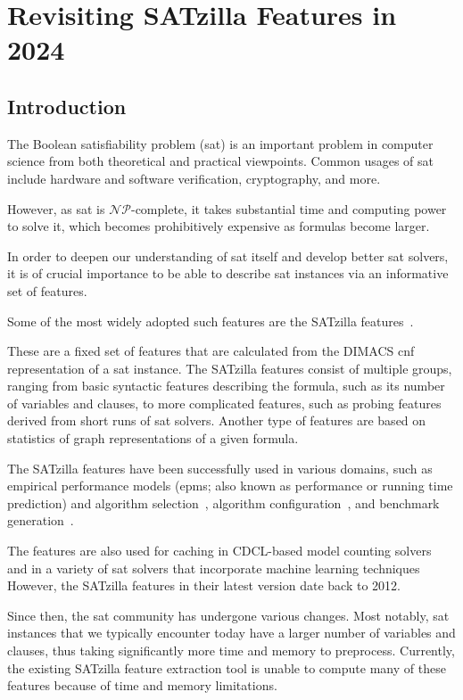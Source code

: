 \chapter{Revisiting SATzilla Features in 2024}\label{ch:ch03:rev_SATzilla}

\section{Introduction}


The Boolean satisfiability problem (\gls{sat}) is an important problem in computer science from both theoretical and practical viewpoints.
Common usages of \gls{sat} include hardware and software verification, cryptography, and more. 

However, as \gls{sat} is $\mathcal{NP}$-complete, it takes substantial time and computing power to solve it, which becomes prohibitively expensive as formulas become larger.

In order to deepen our understanding of \gls{sat} itself and develop better \gls{sat} solvers, it is of crucial importance to be able to describe \gls{sat} instances via an informative set of features.


Some of the most widely adopted such features are the SATzilla features~\cite{NudEtAl04,HutEtAl14}. 

These are a fixed set of features that are calculated from the DIMACS \gls{cnf} representation of a \gls{sat} instance. The SATzilla features consist of multiple groups, ranging from basic syntactic features describing the formula, such as its number of variables and clauses, to more complicated features, such as probing features derived from short runs of \gls{sat} solvers. Another type of features are based on statistics of graph representations of a given formula.

The SATzilla features have been successfully used in various domains, such as empirical performance models (\glspl{epm}; also known as performance or running time prediction) and algorithm selection~\cite{XuEtAl08,XuEtAl12}, algorithm configuration~\cite{HutEtAl11}, and benchmark generation~\cite{LeyEtAl09}. 

The features are also used for caching in CDCL-based model counting solvers~\cite{RooEtAl21} and in a variety of \gls{sat} solvers that incorporate machine learning techniques~\cite{GuoEtAl23}
However, the SATzilla features in their latest version date back to 2012. 

Since then, the \gls{sat} community has undergone various changes.
Most notably, \gls{sat} instances that we typically encounter today have a larger number of variables and clauses, thus taking significantly more time and memory to preprocess. Currently, the existing SATzilla feature extraction tool is unable to compute many of these features because of time and memory limitations.


